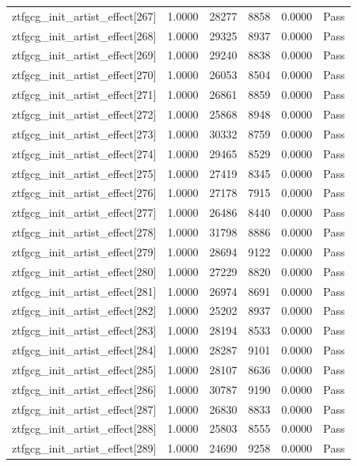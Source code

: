 \begin{table}[htbp]
\begin{tabular}{llrrll}
ztfgcg\_init\_artist\_effect[267] & 1.0000 & 28277 & 8858 & 0.0000 & Pass \\
ztfgcg\_init\_artist\_effect[268] & 1.0000 & 29325 & 8937 & 0.0000 & Pass \\
ztfgcg\_init\_artist\_effect[269] & 1.0000 & 29240 & 8838 & 0.0000 & Pass \\
ztfgcg\_init\_artist\_effect[270] & 1.0000 & 26053 & 8504 & 0.0000 & Pass \\
ztfgcg\_init\_artist\_effect[271] & 1.0000 & 26861 & 8859 & 0.0000 & Pass \\
ztfgcg\_init\_artist\_effect[272] & 1.0000 & 25868 & 8948 & 0.0000 & Pass \\
ztfgcg\_init\_artist\_effect[273] & 1.0000 & 30332 & 8759 & 0.0000 & Pass \\
ztfgcg\_init\_artist\_effect[274] & 1.0000 & 29465 & 8529 & 0.0000 & Pass \\
ztfgcg\_init\_artist\_effect[275] & 1.0000 & 27419 & 8345 & 0.0000 & Pass \\
ztfgcg\_init\_artist\_effect[276] & 1.0000 & 27178 & 7915 & 0.0000 & Pass \\
ztfgcg\_init\_artist\_effect[277] & 1.0000 & 26486 & 8440 & 0.0000 & Pass \\
ztfgcg\_init\_artist\_effect[278] & 1.0000 & 31798 & 8886 & 0.0000 & Pass \\
ztfgcg\_init\_artist\_effect[279] & 1.0000 & 28694 & 9122 & 0.0000 & Pass \\
ztfgcg\_init\_artist\_effect[280] & 1.0000 & 27229 & 8820 & 0.0000 & Pass \\
ztfgcg\_init\_artist\_effect[281] & 1.0000 & 26974 & 8691 & 0.0000 & Pass \\
ztfgcg\_init\_artist\_effect[282] & 1.0000 & 25202 & 8937 & 0.0000 & Pass \\
ztfgcg\_init\_artist\_effect[283] & 1.0000 & 28194 & 8533 & 0.0000 & Pass \\
ztfgcg\_init\_artist\_effect[284] & 1.0000 & 28287 & 9101 & 0.0000 & Pass \\
ztfgcg\_init\_artist\_effect[285] & 1.0000 & 28107 & 8636 & 0.0000 & Pass \\
ztfgcg\_init\_artist\_effect[286] & 1.0000 & 30787 & 9190 & 0.0000 & Pass \\
ztfgcg\_init\_artist\_effect[287] & 1.0000 & 26830 & 8833 & 0.0000 & Pass \\
ztfgcg\_init\_artist\_effect[288] & 1.0000 & 25803 & 8555 & 0.0000 & Pass \\
ztfgcg\_init\_artist\_effect[289] & 1.0000 & 24690 & 9258 & 0.0000 & Pass \\

\end{tabular}
\end{table}
